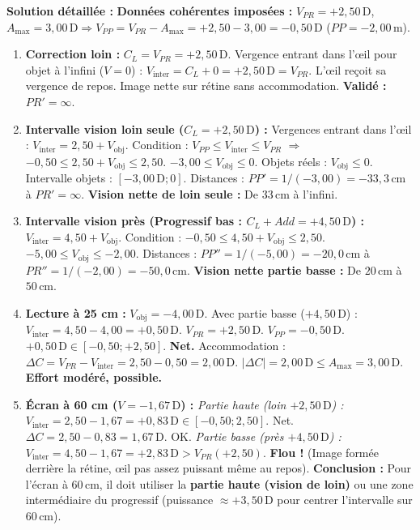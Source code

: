 \documentclass[11pt]{article}
\begin{document}
\begin{exoresolu}
\tcblower
\textbf{Solution détaillée :}
\textbf{Données cohérentes imposées :} $V_{PR} = +2,50\,\text{D}$, $A_{\text{max}} = 3,00\,\text{D} \Rightarrow V_{PP} = V_{PR} - A_{\text{max}} = +2,50 - 3,00 = -0,50\,\text{D}$ ($PP = -2,00\,\text{m}$).
\begin{enumerate}
    \item \textbf{Correction loin :} $C_L = V_{PR} = +2,50\,\text{D}$.
    Vergence entrant dans l'œil pour objet à l'infini ($V=0$) : $V_{\text{inter}} = C_L + 0 = +2,50\,\text{D} = V_{PR}$.
    L'œil reçoit sa vergence de repos. Image nette sur rétine sans accommodation.
    \textbf{Validé :} $PR' = \infty$.
    \item \textbf{Intervalle vision loin seule ($C_L = +2,50\,\text{D}$) :}
    Vergences entrant dans l'œil : $V_{\text{inter}} = 2,50 + V_{\text{obj}}$.
    Condition : $V_{PP} \le V_{\text{inter}} \le V_{PR}$ $\Rightarrow$ $-0,50 \le 2,50 + V_{\text{obj}} \le 2,50$.
    $-3,00 \le V_{\text{obj}} \le 0$.
    Objets réels : $V_{\text{obj}} \le 0$. Intervalle objets : $[ -3,00\,\text{D} ; 0 ]$.
    Distances : $PP' = 1/(-3,00) = -33,3\,\text{cm}$ à $PR' = \infty$.
    \textbf{Vision nette de loin seule :} De $33\,\text{cm}$ à l'infini.
    \item \textbf{Intervalle vision près (Progressif bas : $C_L + Add = +4,50\,\text{D}$) :}
    $V_{\text{inter}} = 4,50 + V_{\text{obj}}$.
    Condition : $-0,50 \le 4,50 + V_{\text{obj}} \le 2,50$.
    $-5,00 \le V_{\text{obj}} \le -2,00$.
    Distances : $PP'' = 1/(-5,00) = -20,0\,\text{cm}$ à $PR'' = 1/(-2,00) = -50,0\,\text{cm}$.
    \textbf{Vision nette partie basse :} De $20\,\text{cm}$ à $50\,\text{cm}$.
    \item \textbf{Lecture à 25 cm :} $V_{\text{obj}} = -4,00\,\text{D}$.
    Avec partie basse ($+4,50\,\text{D}$) : $V_{\text{inter}} = 4,50 - 4,00 = +0,50\,\text{D}$.
    $V_{PR} = +2,50\,\text{D}$. $V_{PP} = -0,50\,\text{D}$.
    $+0,50\,\text{D} \in [-0,50 ; +2,50]$. \textbf{Net.}
    Accommodation : $\Delta C = V_{PR} - V_{\text{inter}} = 2,50 - 0,50 = 2,00\,\text{D}$.
    $|\Delta C| = 2,00\,\text{D} \le A_{\text{max}} = 3,00\,\text{D}$. \textbf{Effort modéré, possible.}
    \item \textbf{Écran à 60 cm ($V = -1,67\,\text{D}$) :}
    \textit{Partie haute (loin $+2,50\,\text{D}$) :} $V_{\text{inter}} = 2,50 - 1,67 = +0,83\,\text{D} \in [-0,50; 2,50]$. Net. $\Delta C = 2,50 - 0,83 = 1,67\,\text{D}$. OK.
    \textit{Partie basse (près $+4,50\,\text{D}$) :} $V_{\text{inter}} = 4,50 - 1,67 = +2,83\,\text{D} > V_{PR}(+2,50)$.
    \textbf{Flou !} (Image formée derrière la rétine, œil pas assez puissant même au repos).
    \textbf{Conclusion :} Pour l'écran à $60\,\text{cm}$, il doit utiliser la \textbf{partie haute (vision de loin)} ou une zone intermédiaire du progressif (puissance $\approx +3,50\,\text{D}$ pour centrer l'intervalle sur $60\,\text{cm}$).
\end{enumerate}
\end{exoresolu}
\end{document}

